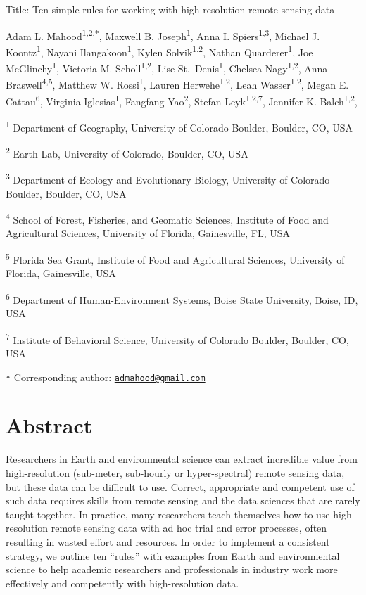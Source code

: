 \documentclass[
  12pt,
]{article}
\author{}
\date{\vspace{-2.5em}}
\begin{document}

\linenumbers

Title: Ten simple rules for working with high-resolution remote sensing
data

Adam L. Mahood\textsuperscript{1,2,\texttt{*}}, Maxwell B.
Joseph\textsuperscript{1}, Anna I. Spiers\textsuperscript{1,3}, Michael
J. Koontz\textsuperscript{1}, Nayani Ilangakoon\textsuperscript{1},
Kylen Solvik\textsuperscript{1,2}, Nathan Quarderer\textsuperscript{1},
Joe McGlinchy\textsuperscript{1}, Victoria M.
Scholl\textsuperscript{1,2}, Lise St.~Denis\textsuperscript{1}, Chelsea
Nagy\textsuperscript{1,2}, Anna Braswell\textsuperscript{4,5}, Matthew
W. Rossi\textsuperscript{1}, Lauren Herwehe\textsuperscript{1,2}, Leah
Wasser\textsuperscript{1,2}, Megan E. Cattau\textsuperscript{6},
Virginia Iglesias\textsuperscript{1}, Fangfang Yao\textsuperscript{2},
Stefan Leyk\textsuperscript{1,2,7}, Jennifer K.
Balch\textsuperscript{1,2},

\textsuperscript{1} Department of Geography, University of Colorado
Boulder, Boulder, CO, USA

\textsuperscript{2} Earth Lab, University of Colorado, Boulder, CO, USA

\textsuperscript{3} Department of Ecology and Evolutionary Biology,
University of Colorado Boulder, Boulder, CO, USA

\textsuperscript{4} School of Forest, Fisheries, and Geomatic Sciences,
Institute of Food and Agricultural Sciences, University of Florida,
Gainesville, FL, USA

\textsuperscript{5} Florida Sea Grant, Institute of Food and
Agricultural Sciences, University of Florida, Gainesville, USA

\textsuperscript{6} Department of Human-Environment Systems, Boise State
University, Boise, ID, USA

\textsuperscript{7} Institute of Behavioral Science, University of
Colorado Boulder, Boulder, CO, USA

\texttt{*} Corresponding author:
\href{mailto:admahood@gmail.com}{\nolinkurl{admahood@gmail.com}}

\hypertarget{abstract}{%
\section{Abstract}\label{abstract}}

Researchers in Earth and environmental science can extract incredible
value from high-resolution (sub-meter, sub-hourly or hyper-spectral)
remote sensing data, but these data can be difficult to use. Correct,
appropriate and competent use of such data requires skills from remote
sensing and the data sciences that are rarely taught together. In
practice, many researchers teach themselves how to use high-resolution
remote sensing data with ad hoc trial and error processes, often
resulting in wasted effort and resources. In order to implement a
consistent strategy, we outline ten ``rules'' with examples from Earth
and environmental science to help academic researchers and professionals
in industry work more effectively and competently with high-resolution
data.
\end{document}
